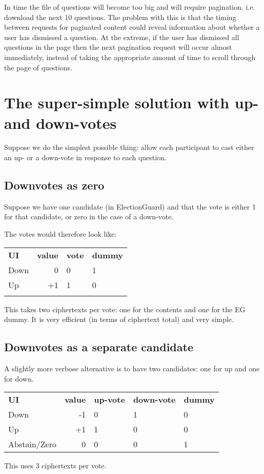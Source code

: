 \documentclass[10pt,a4paper]{article}
\begin{document}
In time the file of questions will become too big and will require pagination. i.e. download the next 10 questions. The problem with this is that the timing between requests for paginated content could reveal information about whether a user has dismissed a question. At the extreme, if the user has dismissed all questions in the page then the next pagination request will occur almost immediately, instead of taking the appropriate amount of time to scroll through the page of questions.


\section{The super-simple solution with up- and down-votes}
Suppose we do the simplest possible thing: allow each participant to cast either an up- or a down-vote in response to each question.

\subsection{Downvotes as zero}
Suppose we have one candidate (in ElectionGuard) and that the vote is either 1 for that candidate, or zero in the case of a down-vote.

The votes would therefore look like:

\begin{tabular}{lrll}
	\\
	{\bf UI}  & {\bf value }&{\bf  vote} &{\bf  dummy }\\
	Down   & 0          & 0          & 1    \\
	Up   & +1          & 1          & 0    \\ \\
\end{tabular}

This takes two ciphertexts per vote: one for the contents and one for the EG dummy.
It is very efficient (in terms of ciphertext total) and very simple.

\subsection{Downvotes as a separate candidate}
A slightly more verbose alternative is to have two candidates: one for up and one for down.

\begin{tabular}{lrlll}
	\\
	{\bf UI}  & {\bf value }&{\bf  up-vote} &{\bf  down-vote} & {\bf  dummy }\\
	Down   & -1          & 0          & 1   & 0 \\
	Up   & +1          & 1          & 0    & 0\\ 
	Abstain/Zero & 0 & 0 & 0 & 1 \\
\end{tabular}
This uses 3 ciphertexts per vote.
\end{document}

